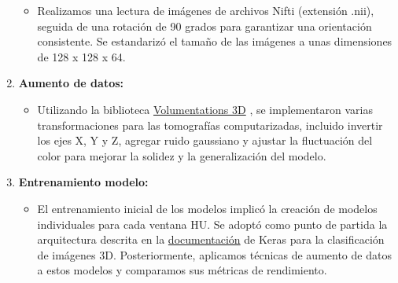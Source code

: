 \documentclass[10pt, oneside, a4paper]{article}
\begin{document}
\begin{enumerate}
\begin{itemize}
\begin{table}[H]
	\centering
	\caption{Ventanas HU para procesamiento de Tomografías Computarizadas}
	\label{tab:ventanas_hu}
\end{table}
			
			\item Realizamos una lectura de imágenes de archivos Nifti (extensión .nii), seguida de una rotación de 90 grados para garantizar una orientación consistente. Se estandarizó el tamaño de las imágenes a unas dimensiones de 128 x 128 x 64.
		\end{itemize}
	
		\item \textbf{Aumento de datos:}
		\begin{itemize}
			\item Utilizando la biblioteca \href{https://github.com/ZFTurbo/volumentations}{Volumentations 3D} \cite{solovyev20223d}, se implementaron varias transformaciones para las tomografías computarizadas, incluido invertir los ejes X, Y y Z, agregar ruido gaussiano y ajustar la fluctuación del color para mejorar la solidez y la generalización del modelo.
		\end{itemize}
	
		\item \textbf{Entrenamiento modelo:}
		\begin{itemize}
			\item El entrenamiento inicial de los modelos implicó la creación de modelos individuales para cada ventana HU. Se adoptó como punto de partida la arquitectura descrita en la \href{https://keras.io/examples/vision/3D_image_classification/#make-predictions-on-a-single-ct-scan}{documentación} de Keras para la clasificación de imágenes 3D. Posteriormente, aplicamos técnicas de aumento de datos a estos modelos y comparamos sus métricas de rendimiento.
			

\end{itemize}
\end{enumerate}
\end{document}

